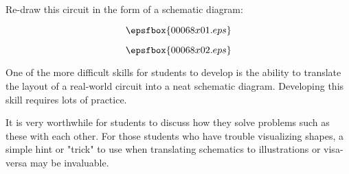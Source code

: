 

Re-draw this circuit in the form of a schematic diagram:

$$\epsfbox{00068x01.eps}$$







$$\epsfbox{00068x02.eps}$$







One of the more difficult skills for students to develop is the ability to translate the layout of a real-world circuit into a neat schematic diagram.  Developing this skill requires lots of practice.

It is very worthwhile for students to discuss how they solve problems such as these with each other.  For those students who have trouble visualizing shapes, a simple hint or "trick" to use when translating schematics to illustrations or visa-versa may be invaluable.




